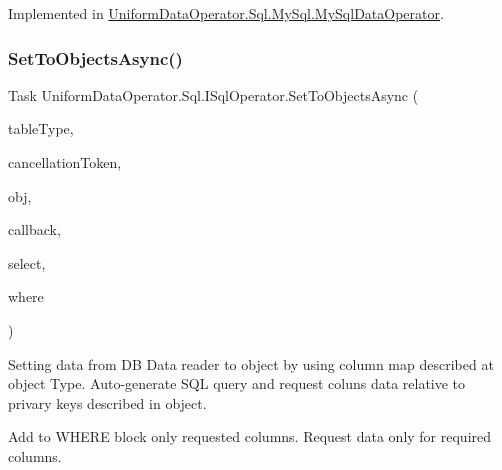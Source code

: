 Implemented in \mbox{\hyperlink{class_uniform_data_operator_1_1_sql_1_1_my_sql_1_1_my_sql_data_operator_a4079de461f0a37c0b69754a0e93dc05b}{Uniform\+Data\+Operator.\+Sql.\+My\+Sql.\+My\+Sql\+Data\+Operator}}.

\mbox{\label{interface_uniform_data_operator_1_1_sql_1_1_i_sql_operator_a396bf6c6d962ba910367755ad13d3d3c}} 
\subsubsection{\texorpdfstring{Set\+To\+Objects\+Async()}{SetToObjectsAsync()}\hspace{0.1cm}{\footnotesize\ttfamily [1/3]}}
{\footnotesize\ttfamily Task Uniform\+Data\+Operator.\+Sql.\+I\+Sql\+Operator.\+Set\+To\+Objects\+Async (\begin{DoxyParamCaption}\item[{Type}]{table\+Type,  }\item[{Cancellation\+Token}]{cancellation\+Token,  }\item[{object}]{obj,  }\item[{Action$<$ I\+List $>$}]{callback,  }\item[{string \mbox{[}$\,$\mbox{]}}]{select,  }\item[{params string \mbox{[}$\,$\mbox{]}}]{where }\end{DoxyParamCaption})}



Setting data from DB Data reader to object by using column map described at object Type. Auto-\/generate S\+QL query and request coluns data relative to privary keys described in object. 

Add to W\+H\+E\+RE block only requested columns. Request data only for required columns. 


